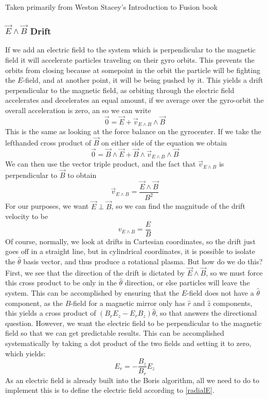 \documentclass[12pt]{article}
\begin{document}
Taken primarily from Weston Stacey's Introduction to Fusion book
\subsubsection{$\vec{E}\wedge\vec{B}$ Drift}
If we add an electric field to the system which is perpendicular to the magnetic field it will accelerate particles traveling on their gyro orbits. This prevents the orbits from closing because at somepoint in the orbit the particle will be fighting the $E$-field, and at another point, it will be being pushed by it. This yields a drift perpendicular to the magnetic field, as orbiting through the electric field accelerates and decelerates an equal amount, if we average over the gyro-orbit the overall acceleration is zero, an so we can write
$$\vec{0}=\vec{E}+\vec{v}_{E\wedge B}\wedge\vec{B}$$
This is the same as looking at the force balance on the gyrocenter.
If we take the lefthanded cross product of $\vec{B}$ on either side of the equation we obtain
$$\vec{0}=\vec{B}\wedge\vec{E}+\vec{B}\wedge\vec{v}_{E\wedge B}\wedge\vec{B}$$
We can then use the vector triple product, and the fact that $\vec{v}_{E\wedge B}$ is perpendicular to $\vec{B}$ to obtain
\begin{equation}\label{EcrossB}
\vec{v}_{E\wedge B}=\frac{\vec{E}\wedge\vec{B}}{B^2}
\end{equation} 
For our purposes, we want $\vec{E}\perp\vec{B}$, so we can find the magnitude of the drift velocity to be
\begin{equation}\label{driftmag}
v_{E\wedge B}=\frac{E}{B}
\end{equation} 
Of course, normally, we look at drifts in Cartesian coordinates, so the drift just goes off in a straight line, but in cylindrical coordinates, it is possible to isolate the $\hat{\theta}$ basis vector, and thus produce a rotational plasma. But how do we do this? First, we see that the direction of the drift is dictated by $\vec{E}\wedge\vec{B}$, so we must force this cross product to be only in the $\hat{\theta}$ direction, or else particles will leave the system. This can be accomplished by ensuring that the $E$-field does not have a $\hat{\theta}$ component, as the $B$-field for a magnetic mirror only has $\hat{r}$ and $\hat{z}$ components, this yields a cross product of $(B_rE_z-E_rB_z)\hat{\theta}$, so that answers the directional question. However, we want the electric field to be perpendicular to the magnetic field so that we can get predictable results. This can be accomplished systematically by taking a dot product of the two fields and setting it to zero, which yields:
\begin{equation}\label{radialE}
E_r=-\frac{B_z}{B_r}E_z
\end{equation}
As an electric field is already built into the Boris algorithm, all we need to do to implement this is to define the electric field according to \eqref{radialE}.
\end{document}
